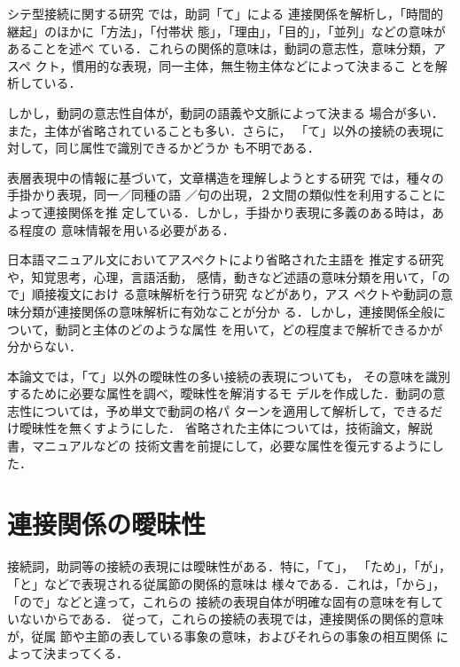 シテ型接続に関する研究\cite{Jinta1995} では，助詞「て」による
連接関係を解析し，「時間的継起」のほかに「方法」，「付帯状
態」，「理由」，「目的」，「並列」などの意味があることを述べ
ている．これらの関係的意味は，動詞の意志性，意味分類，アスペ
クト，慣用的な表現，同一主体，無生物主体などによって決まるこ
とを解析している．

しかし，動詞の意志性自体が，動詞の語義や文脈によって決まる
場合が多い．また，主体が省略されていることも多い．さらに，
「て」以外の接続の表現に対して，同じ属性で識別できるかどうか
も不明である．

表層表現中の情報に基づいて，文章構造を理解しようとする研究
\cite{KurohasiAndNagao1994} では，種々の手掛かり表現，同一／同種の語
／句の出現，２文間の類似性を利用することによって連接関係を推
定している．しかし，手掛かり表現に多義のある時は，ある程度の
意味情報を用いる必要がある．

日本語マニュアル文においてアスペクトにより省略された主語を
推定する研究\cite{NakagawaAndMori1995} や，知覚思考，心理，言語活動，
感情，動きなど述語の意味分類を用いて，「ので」順接複文におけ
る意味解析を行う研究\cite{KimuraAndNisizawaAndNakagawa1996} などがあり，アス
ペクトや動詞の意味分類が連接関係の意味解析に有効なことが分か
る．しかし，連接関係全般について，動詞と主体のどのような属性
を用いて，どの程度まで解析できるかが分からない．

本論文では，「て」以外の曖昧性の多い接続の表現についても，
その意味を識別するために必要な属性を調べ，曖昧性を解消するモ
デルを作成した．動詞の意志性については，予め単文で動詞の格パ
ターンを適用して解析して，できるだけ曖昧性を無くすようにした．
省略された主体については，技術論文，解説書，マニュアルなどの
技術文書を前提にして，必要な属性を復元するようにした．

\section{連接関係の曖昧性}
接続詞，助詞等の接続の表現には曖昧性がある．特に，「て」，
「ため」，「が」，「と」などで表現される従属節の関係的意味は
様々である．これは，「から」，「ので」などと違って，これらの
接続の表現自体が明確な固有の意味を有していないからである．
従って，これらの接続の表現では，連接関係の関係的意味が，従属
節や主節の表している事象の意味，およびそれらの事象の相互関係
によって決まってくる．

